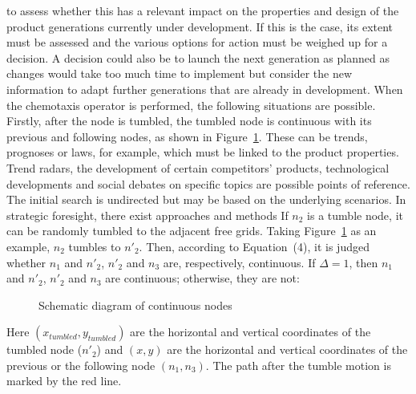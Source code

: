 \documentclass{PDS}%
\theoremstyle{definition}
\begin{document}
to assess whether this has a relevant impact on the properties and design of the product generations
currently under development. If this is the case, its extent must be assessed and the various options for
action must be weighed up for a decision. A decision could also be to launch the next generation as
planned as changes would take too much time to implement but consider the new information to adapt
further generations that are already in development.
When the chemotaxis operator is performed, the following situations are possible.
Firstly, after the node is tumbled, the tumbled node is continuous with its previous and
following nodes, as shown in Figure~\ref{fig:3}. These can be trends, prognoses or laws, for example, which
must be linked to the product properties. Trend radars, the development of certain competitors' products,
technological developments and social debates on specific topics are possible points of reference. The
initial search is undirected but may be based on the underlying scenarios. In strategic foresight, there
exist approaches and methods If $n_2$ is a tumble node, it can be
randomly tumbled to the adjacent free grids. Taking Figure~\ref{fig:3} as an
\hbox{example,} $n_2$ tumbles to $n'_2$. Then, according to Equation~(4), it is judged
whether $n_1$ and $n'_2$, $n'_2$ and $n_3$ are, respectively, continuous. If $\Delta=1$, then
$n_1$ and $n'_2$, $n'_2$ and $n_3$ are continuous; otherwise, they are not: 
\begin{figure}[h!]
\caption{Schematic diagram of continuous nodes}
\label{fig:3}
\end{figure}

Here
$(x_{tumbled}, y_{tumbled})$ are the horizontal and vertical coordinates of the tumbled
node ($n'_2$) and $(x, y)$ are the horizontal and vertical coordinates of the previous or
the following node $(n_1, n_3)$. The path after the tumble motion is marked by the red
line.
\end{document}
